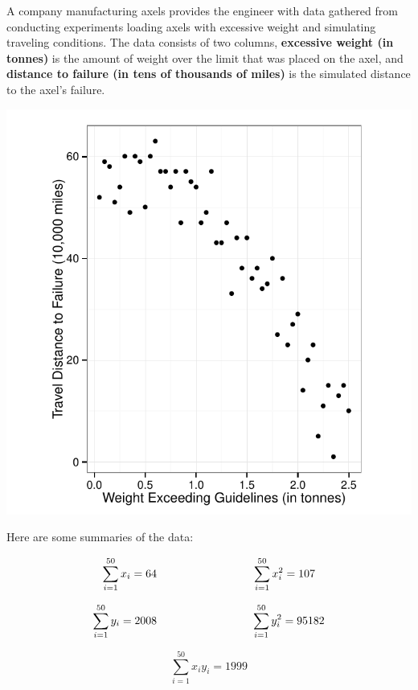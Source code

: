 \documentclass[addpoints]{examsetup}\usepackage[]{graphicx}\usepackage[]{color}
\newenvironment{knitrout}{}{} %
\begin{document}
\begin{questions}
A company manufacturing axels provides the engineer with data gathered from conducting experiments loading axels with excessive weight and simulating traveling conditions.
The data consists of two columns, \textbf{excessive weight (in tonnes)} is the amount of weight over the limit that was placed on the axel, and 
\textbf{distance to failure (in tens of thousands of miles)} is the simulated distance to the axel's failure. 



\begin{center}
\begin{knitrout}
\color{fgcolor}
\includegraphics[width=.5\linewidth]{figure/unnamed-chunk-7-1} 

\end{knitrout}
\end{center}

Here are some summaries of the data:

$$
\sum_{i=1}^{50} x_i = 64 \hspace{3cm} \sum_{i=1}^{50} x_i^2 = 107 \\
$$

$$
\sum_{i=1}^{50} y_i = 2008 \hspace{3cm} \sum_{i=1}^{50} y_i^2 = 95182 \\
$$

$$
\sum_{i=1}^{50} x_i y_i = 1999
$$

\end{questions}
\end{document}
